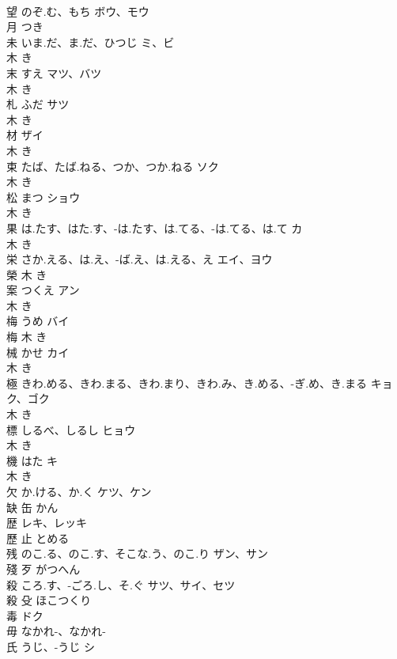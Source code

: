 \documentclass[8pt]{extreport}
\begin{document}
\begin{CJK}{UTF8}{min}
\\	望	のぞ.む、もち	ボウ、モウ	
\\	月		つき		
\\	未	いま.だ、ま.だ、ひつじ	ミ、ビ	
\\	木		き		
\\	末	すえ	マツ、バツ	
\\	木		き		
\\	札	ふだ	サツ	
\\	木		き		
\\	材		ザイ	
\\	木		き		
\\	束	たば、たば.ねる、つか、つか.ねる	ソク	
\\	木		き		
\\	松	まつ	ショウ	
\\	木		き		
\\	果	は.たす、はた.す、-は.たす、は.てる、-は.てる、は.て	カ	
\\	木		き		
\\	栄	さか.える、は.え、-ば.え、は.える、え	エイ、ヨウ	
\\	榮	木		き		
\\	案	つくえ	アン	
\\	木		き		
\\	梅	うめ	バイ	
\\	梅	木		き		
\\	械	かせ	カイ	
\\	木		き		
\\	極	きわ.める、きわ.まる、きわ.まり、きわ.み、き.める、-ぎ.め、き.まる	キョク、ゴク	
\\	木		き		
\\	標	しるべ、しるし	ヒョウ	
\\	木		き		
\\	機	はた	キ	
\\	木		き		
\\	欠	か.ける、か.く	ケツ、ケン	
\\	缺	缶		かん		
\\	歴		レキ、レッキ	
\\	歷	止		とめる		
\\	残	のこ.る、のこ.す、そこな.う、のこ.り	ザン、サン	
\\	殘	歹		がつへん		
\\	殺	ころ.す、-ごろ.し、そ.ぐ	サツ、サイ、セツ	
\\	殺	殳		ほこつくり		
\\	毒		ドク	
\\	毋		なかれ-、なかれ-		
\\	氏	うじ、-うじ	シ	

\end{CJK}
\end{document}
